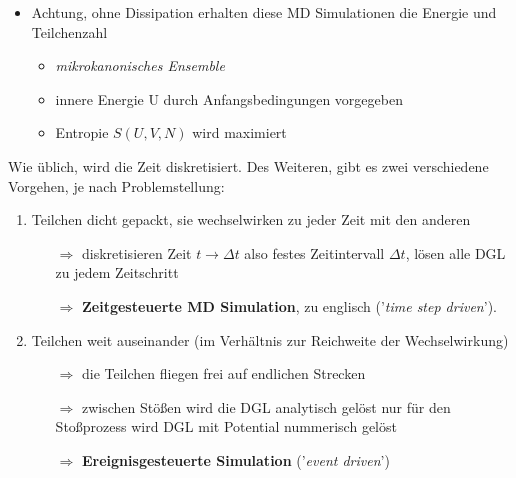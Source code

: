 \documentclass[12pt]{article}
\begin{document}
 \begin{itemize}
 \item Achtung, ohne Dissipation erhalten diese MD Simulationen die Energie und Teilchenzahl 
\begin{itemize}
\item \textit{mikrokanonisches Ensemble}
\item  innere Energie U durch Anfangsbedingungen vorgegeben
\item Entropie $S(U,V,N)$ wird maximiert %
\end{itemize} 
\end{itemize}
Wie üblich, wird die Zeit diskretisiert. Des Weiteren, gibt es zwei verschiedene Vorgehen, je nach Problemstellung:
 \begin{enumerate}
 \item Teilchen dicht gepackt, sie wechselwirken zu jeder Zeit mit den anderen 
 \begin{itemize}
 \item[$\Rightarrow$] diskretisieren Zeit $t \to \Delta t$ also festes Zeitintervall $\Delta t$, lösen alle DGL zu jedem Zeitschritt 
 \item[$\Rightarrow$] \textbf{Zeitgesteuerte MD Simulation}, zu englisch ('\textit{time step driven}').
 \end{itemize}
 
 \item Teilchen weit auseinander (im Verhältnis zur Reichweite der Wechselwirkung) 
 \begin{itemize}
 \item[$\Rightarrow$] die Teilchen fliegen frei auf endlichen Strecken
 \item[$\Rightarrow$] zwischen Stößen wird die DGL analytisch gelöst nur für den Stoßprozess wird DGL mit Potential nummerisch gelöst
 \item[$\Rightarrow$]  \textbf{Ereignisgesteuerte Simulation} ('\textit{event driven}')
 \end{itemize}  
 \end{enumerate}
 
\end{document}
